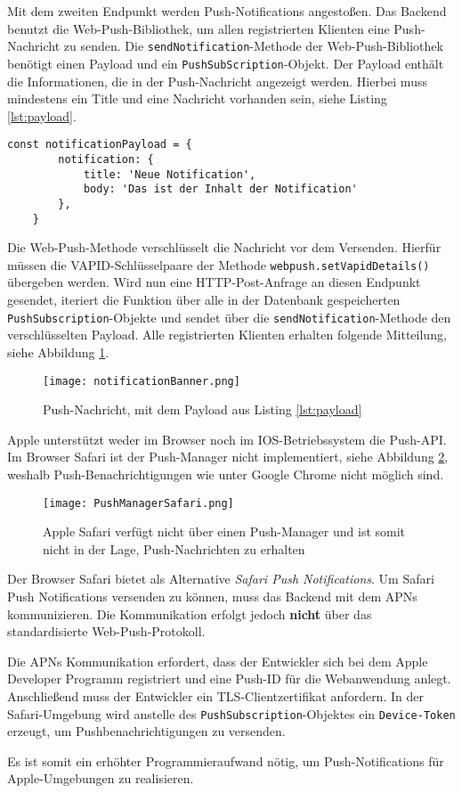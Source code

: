 Mit dem zweiten Endpunkt werden Push-Notifications angestoßen. Das Backend benutzt die Web-Push-Bibliothek, um allen registrierten Klienten eine Push-Nachricht zu senden.  Die \texttt{sendNotification}-Methode der Web-Push-Bibliothek benötigt einen Payload und ein \texttt{PushSubScription}-Objekt. Der Payload enthält die Informationen, die in der Push-Nachricht angezeigt werden. Hierbei muss mindestens ein Title und eine Nachricht vorhanden sein, siehe Listing \ref{lst:payload}. 

\begin{lstlisting}[caption={Mindestanforderung an einen Payload für eine Push-Nachricht}, label=lst:payload, float=!htb]
    const notificationPayload = {
        notification: {
            title: 'Neue Notification',
            body: 'Das ist der Inhalt der Notification'
        },
    }
\end{lstlisting}

Die Web-Push-Methode verschlüsselt die Nachricht vor dem Versenden. Hierfür müssen die VAPID-Schlüsselpaare der Methode \texttt{webpush.setVapidDetails()} übergeben werden. 
Wird nun eine HTTP-Post-Anfrage an diesen Endpunkt gesendet, iteriert die Funktion über alle in der Datenbank gespeicherten \texttt{PushSubscription}-Objekte und sendet über die \texttt{sendNotification}-Methode den verschlüsselten Payload. Alle registrierten Klienten erhalten folgende Mitteilung, siehe Abbildung \ref{img:notificationBanner}.

\begin{figure}[!htb]
    \centering
    \texttt{[image: notificationBanner.png]}
    \caption{Push-Nachricht, mit dem Payload aus Listing \ref{lst:payload}}
    \label{img:notificationBanner}
\end{figure}


Apple unterstützt weder im Browser noch im IOS-Betriebssystem die Push-API. Im Browser Safari ist der Push-Manager nicht implementiert, siehe Abbildung \ref{img:PushManagerBrowser}, weshalb  Push-Benachrichtigungen wie unter Google Chrome nicht möglich sind. 

\begin{figure}[!htb]
    \centering
    \texttt{[image: PushManagerSafari.png]}
    \caption{Apple Safari verfügt nicht über einen Push-Manager und ist somit nicht in der Lage, Push-Nachrichten zu erhalten}
    \label{img:PushManagerBrowser}
\end{figure}


Der Browser Safari bietet als Alternative \textit{Safari Push Notifications}. Um Safari Push Notifications versenden zu können, muss das Backend mit dem \ac*{APNs} kommunizieren. Die Kommunikation erfolgt jedoch \textbf{nicht} über das standardisierte Web-Push-Protokoll.

Die APNs Kommunikation erfordert, dass der Entwickler sich bei dem Apple Developer Programm registriert und eine Push-ID für die Webanwendung anlegt. Anschließend muss der Entwickler ein \ac*{TLS}-Clientzertifikat anfordern. In der Safari-Umgebung wird anstelle des \texttt{PushSubscription}-Objektes ein \texttt{Device-Token} erzeugt, um Pushbenachrichtigungen zu versenden. 

Es ist somit ein erhöhter Programmieraufwand nötig, um Push-Notifications für Apple-Umgebungen zu realisieren.
